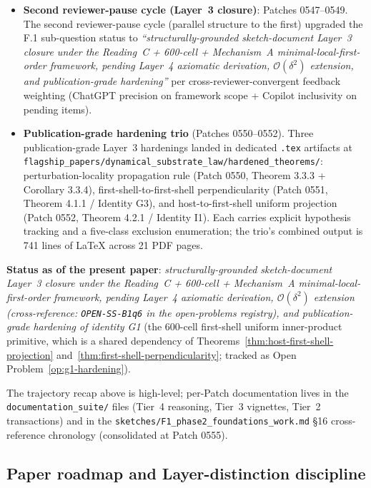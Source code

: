 \documentclass[11pt,letterpaper]{article}
\newcommand{\bigO}[1]{\mathcal{O}(#1)}
\begin{document}
\begin{itemize}[leftmargin=2em]
\item \textbf{Second reviewer-pause cycle (Layer~3 closure)}: Patches 0547--0549. The second reviewer-pause cycle (parallel structure to the first) upgraded the F.1 sub-question status to \emph{``structurally-grounded sketch-document Layer~3 closure under the Reading~C + 600-cell + Mechanism~A minimal-local-first-order framework, pending Layer~4 axiomatic derivation, $\bigO{\delta^2}$ extension, and publication-grade hardening''} per cross-reviewer-convergent feedback weighting (ChatGPT precision on framework scope + Copilot inclusivity on pending items).
\item \textbf{Publication-grade hardening trio} (Patches 0550--0552). Three publication-grade Layer~3 hardenings landed in dedicated \texttt{.tex} artifacts at \texttt{flagship\_papers/dynamical\_substrate\_law/\linebreak hardened\_theorems/}: perturbation-locality propagation rule (Patch 0550, Theorem 3.3.3 + Corollary 3.3.4), first-shell-to-first-shell perpendicularity (Patch 0551, Theorem 4.1.1 / Identity G3), and host-to-first-shell uniform projection (Patch 0552, Theorem 4.2.1 / Identity I1). Each carries explicit hypothesis tracking and a five-class exclusion enumeration; the trio's combined output is 741 lines of LaTeX across 21 PDF pages.
\end{itemize}

\textbf{Status as of the present paper}: \emph{structurally-grounded sketch-document Layer~3 closure under the Reading~C + 600-cell + Mechanism~A minimal-local-first-order framework, pending Layer~4 axiomatic derivation, $\bigO{\delta^2}$ extension (cross-reference: \texttt{OPEN-SS-B1q6} in the open-problems registry), and publication-grade hardening of identity G1} (the 600-cell first-shell uniform inner-product primitive, which is a shared dependency of Theorems~\ref{thm:host-first-shell-projection} and~\ref{thm:first-shell-perpendicularity}; tracked as Open Problem~\ref{op:g1-hardening}).

The trajectory recap above is high-level; per-Patch documentation lives in the \texttt{documentation\_suite/} files (Tier~4 reasoning, Tier~3 vignettes, Tier~2 transactions) and in the \texttt{sketches/F1\_phase2\_foundations\_work.md} \S16 cross-reference chronology (consolidated at Patch 0555).

\subsection{Paper roadmap and Layer-distinction discipline}
\label{sec:roadmap-and-layer-discipline}
\end{document}
